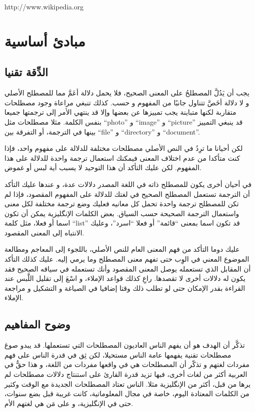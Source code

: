 http://www.wikipedia.org

\section[ref:34314226]{مبادئ أساسية}
\subsection{الدِّقة تقنيا}
يجب أن يَدُلَّ المصطلحُ على المعنى الصحيح، فلا يحمل دلالة أعَمَّ مما
للمصطلح الأصلي و لا دلالة أخَصَّ تتناول جانبًا من المفهوم و حسب. كذلك
تنبغي مراعاة وجود مصطلحات متقاربة لكنها متباينة يجب تمييزها عن بعضها
وإلا قد ينتهي الأمر إلى ترجمتها جميعا بنفس الكلمة. مثلا مصطلحات مثل
“photo” و “image” و “picture” قد ينبغي التمييز بينها في الترجمة، أو
التفرقة بين “file” و “directory” و “document”.

لكن أحيانا ما ترِدُ في النص الأصلي مصطلحات مختلفة للدلالة على مفهوم
واحد، فإذا كنت متأكدا من عدم اختلاف المعنى فيمكنك استعمال ترجمة واحدة
للدلالة على هذا المفهوم. لكن عليك التأكد أن هذا التوحيد لا يسبب أية لبس
أو غموض.

في أحيان أخرى يكون للمصطلح ذاته في اللغة المصدر دلالات عدة، و عندها عليك
التأكد أن الترجمة تستعمل المصطلح الصحيح في لغتك للدلالة على المفهوم
المقصود، فإذا لم تكن للمصطلح ترجمة واحدة تحمل كل معانيه فعليك وضع ترجمة
مختلفة لكل معنى واستعمال الترجمة الصحيحة حسب السياق. بعض الكلمات
الإنگليزية يمكن أن تكون اسما أو فعلا، مثل كلمة “list” قد تكون اسما
بمعنى “قائمة” أو فعلا “اسرد”، وعليك الانتباه إلى المعنى المقصود.

عليك دوما التأكد من فهم المعنى العام للنص الأصلي، باللجوء إلى المعاجم
ومطالعة الموضوع المعني في الوِب حتى تفهم معنى المصطلح وما يرمي إليه.
عليك كذلك التأكد أن المقابل الذي تستعمله يوصل المعنى المقصود وأنك
تستعمله في سياقه الصحيح فقد يكون له دلالات أخرى لا تقصدها. راعِ كذلك
قواعد الإملاء، و اسْعَ إلى تقليل اللَّبس عند القراءة بقدر الإمكان حتى
لو تطلب ذلك وقتا إضافيا في الصياغة و التشكيل و مراجعة الإملاء.

\subsection{وضوح المفاهيم}
تذكَّر أن الهدف هو أن يفهم الناس العاديون المصطلحات التي تستعملها. قد
يبدو صوغ مصطلحات تقنية يفهمها عامة الناس مستحيلا، لكن ثِق في قدرة الناس
على فهم مفردات لغتهم و تذكّر أن المصطلحات هي في واقعها مفردات من اللغة،
و هذا حقٌّ في العربية أكثر من لغات أخرى، فبها تزيد قدرة القارئ على
استنتاج دلالات مصطلحات لم يرها من قبل، أكثر من الإنگليزية مثلا. الناس
تعتاد المصطلحات الجديدة مع الوقت وكثير من الكلمات المعتادة اليوم، خاصة
في مجال المعلوماتية، كانت غريبة قبل بضع سنوات، حتى في الإنگليزية، و على
مَن هي لغتهم الأم.

